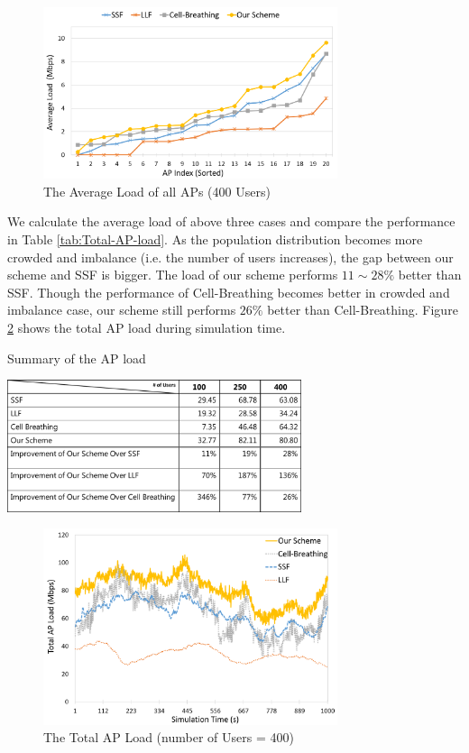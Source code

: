 \begin{figure}[tbp]
\setlength{\abovecaptionskip}{0pt}
\setlength{\belowcaptionskip}{0pt}
\begin{center}
\includegraphics[width=3.4in]{images/Average_AP_load_400.png}
\end{center}
\caption{The Average Load of all APs (400 Users)}
\label{fig:fig4_2c}
\end{figure}

We calculate the average load of above three cases and compare the performance in Table \ref{tab:Total-AP-load}. As the population distribution becomes more crowded and imbalance (i.e. the number of users increases), the gap between our scheme and SSF is bigger. The load of our scheme performs $11\sim28\%$ better than SSF. Though the performance of Cell-Breathing becomes better in crowded and imbalance case, our scheme still performs $26\%$ better than Cell-Breathing. Figure \ref{fig:Total-AP-load} shows the total AP load during simulation time.

\begin{table}[tbp]
\setlength{\belowcaptionskip}{15pt}
\centering
\caption{Summary of the AP load}
\label{tab:Total-AP-load}
\includegraphics[width=3.4in]{images/table4_3.png}
\end{table}

\begin{figure}[tbp]
\begin{center}
\includegraphics[width=3.4in]{images/Total_AP_load.png}
\end{center}
\caption{The Total AP Load (number of Users = 400)}
\label{fig:Total-AP-load}
\end{figure}

